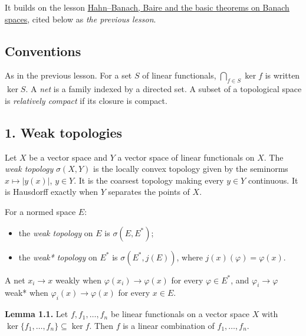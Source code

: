 \documentclass[
  english,
  11pt,
  a4paper,
]{article}
\providecommand{\tightlist}{%
  \setlength{\itemsep}{0pt}\setlength{\parskip}{0pt}}
\begin{document}
It builds on the lesson
\href{https://kokunoyumeto.github.io/open-math-courses/courses/harmonic-analysis-on-locally-compact-groups/reader/programme-reading.html\#ref-5bc8dc4283ec5f38}{Hahn--Banach,
Baire and the basic theorems on Banach spaces}, cited below as \emph{the
previous lesson}.

\subsection{Conventions}\label{weak-topologies-tychonoff-banach-alaoglu-mazur-bipolars-krein-milman-and-eberlein-smulian--conventions}

As in the previous lesson. For a set \(S\) of linear functionals,
\(\bigcap_{f\in S}\ker f\) is written \(\ker S\). A \emph{net} is a
family indexed by a directed set. A subset of a topological space is
\emph{relatively compact} if its closure is compact.

\subsection[1. Weak
topologies]{\texorpdfstring{\protect\hypertarget{weak-topologies-tychonoff-banach-alaoglu-mazur-bipolars-krein-milman-and-eberlein-smulian--oa-fnd-wt-01}{}{}1.
Weak
topologies}{1. Weak topologies}}\label{weak-topologies-tychonoff-banach-alaoglu-mazur-bipolars-krein-milman-and-eberlein-smulian--OA-FND-WT-01}

Let \(X\) be a vector space and \(Y\) a vector space of linear
functionals on \(X\). The \emph{weak topology} \(\sigma(X,Y)\) is the
locally convex topology given by the seminorms \(x\mapsto|y(x)|\),
\(y\in Y\). It is the coarsest topology making every \(y\in Y\)
continuous. It is Hausdorff exactly when \(Y\) separates the points of
\(X\).

For a normed space \(E\):

\begin{itemize}
\tightlist
\item
  the \emph{weak topology} on \(E\) is \(\sigma(E,E^*)\);
\item
  the \emph{weak* topology} on \(E^*\) is \(\sigma(E^*,j(E))\), where
  \(j(x)(\varphi)=\varphi(x)\).
\end{itemize}

A net \(x_i\to x\) weakly when \(\varphi(x_i)\to\varphi(x)\) for every
\(\varphi\in E^*\), and \(\varphi_i\to\varphi\) weak* when
\(\varphi_i(x)\to\varphi(x)\) for every \(x\in E\).

\textbf{Lemma 1.1.} Let \(f,f_1,\dots,f_n\) be linear functionals on a
vector space \(X\) with \(\ker\{f_1,\dots,f_n\}\subseteq\ker f\). Then
\(f\) is a linear combination of \(f_1,\dots,f_n\).
\end{document}

